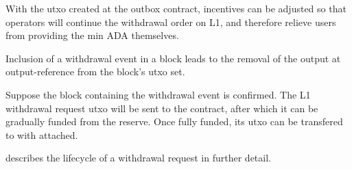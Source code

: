 \documentclass[../midgard.tex]{subfiles}
\begin{document}
With the utxo created at the outbox contract, incentives can be adjusted so that operators will continue the withdrawal order on L1, and therefore relieve users from providing the min ADA themselves.

Inclusion of a withdrawal event in a block leads to the removal of the output at output-reference  from the block's utxo set.

Suppose the block containing the withdrawal event is confirmed.
The L1 withdrawal request utxo will be sent to the  contract, after which it can be gradually funded from the reserve. Once fully funded, its utxo can be transfered to  with  attached.

 describes the lifecycle of a withdrawal request in further detail.
\end{document}
